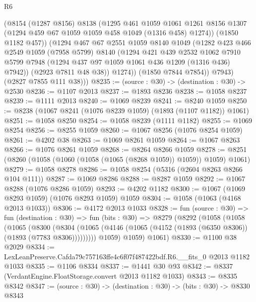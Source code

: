 \begin{lexlean}{R6}
\begin{coremodule}
              (@8154
                (@1287 @8156)
                @8138
                (@1295
                  @461
                  @1059
                  @1061
                  @1261
                  @8156
                  @1307
                  (@1294 @459 @67 @1059 @1059 @458 @1049 (@1316 @458) @1274))
                (@1850 @1182 @457))
              (@1294
                @467
                @67
                @2551
                @1059
                @8140
                @1049
                (@1282
                  @423
                  @466
                  @2549
                  @1059
                  (@7958 @5799)
                  @8140
                  (@1294
                    @421
                    @439
                    @2532
                    @1062
                    @7910
                    @5799
                    @7948
                    (@1294 @437 @97 @1059 @1061 @436 @1209 (@1316 @436) @7942))
                  (@2923 @7811 @48 @38))
                @1274))
            (@1850 @7844 @7854))
          @7943)
        (@2827 @7855 @111 @38)))
@8235 := (source : @30) -> (destination : @30) -> @2530
@8236 := @1107 @2013
@8237 := @1893 @8236
@8238 := @1058 @8237
@8239 := @1111 @2013
@8240 := @1069 @8239
@8241 := @8240 @1059
@8250 := @8238 (@1067 @8241 (@1076 @8239 @1059) (@1893 (@1107 @1182)) @1061)
@8251 := @1058 @8250
@8254 := @1058 @8239 (@1111 @1182)
@8255 := @1069 @8254
@8256 := @8255 @1059
@8260 := @1067 @8256 (@1076 @8254 @1059)
@8261 := @4202 @38
@8263 := @1069 @8261 @1059
@8264 := @1067 @8263
@8266 := @1076 @8261 @1059
@8268 := @8264 @8266 @1059
@8278 := @8251 (@8260 (@1058 (@1060 (@1058 (@1065 (@8268 @1059)) @1059)) @1059) @1061)
@8279 := @1058 @8278
@8286 := @1058 @8254 (@5316 (@2604 @8263 @8266 @104 @111))
@8287 := @1069 @8286
@8288 := @8287 @1059
@8292 := @1067 @8288 (@1076 @8286 @1059)
@8293 := @4202 @1182
@8300 := @1067 (@1069 @8293 @1059) (@1076 @8293 @1059) @1059
@8304 := @1058 (@1063 (@4168 @2013 @1033))
@8306 := @4172 @2013 @1033
@8328 := fun (source : @30) =>
  fun (destination : @30) =>
  fun (bits : @30) =>
  @8279
    (@8292
      (@1058
        (@1058
          (@1065
            (@8300
              (@8304 (@1065 (@4146 (@1065 (@4152 (@1893 (@6350 @8306)) (@1893 (@7783 @8306)))))))))
          @1059)
        @1059)
      @1061)
@8330 := @1100 @38 @2029
@8334 := LexLeanPreserve.Cafda79c757163ffe4c6f07f487422bdf.R6.__fits_0 @2013 @1182 @1033
@8335 := @1106 @8334
@8337 := @1441 @30 @93
@8342 := @8337 (VerdantEngine.FloatStorage.convert @2013 @1182 @1033)
@8343 := @8335 @8342
@8347 := (source : @30) -> (destination : @30) -> (bits : @30) -> @8330 @8343

\end{coremodule}
\end{lexlean}
